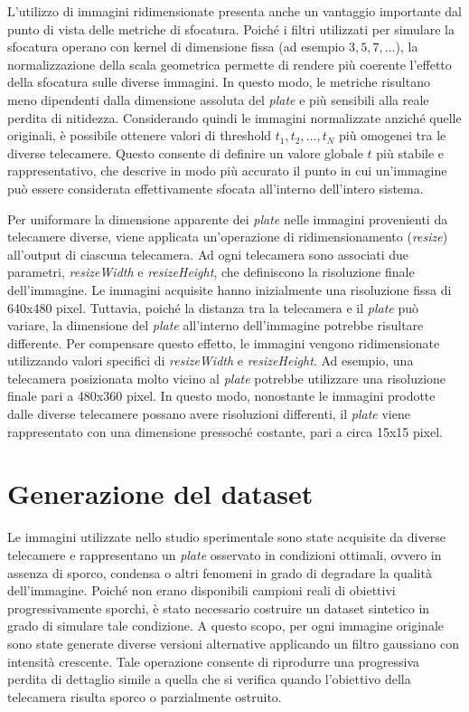 \documentclass[
    target=bach,
    aauheader=,
    style=
]{thud}
\begin{document}
L'utilizzo di immagini ridimensionate presenta anche un vantaggio importante dal punto di vista delle metriche di sfocatura. Poiché i filtri utilizzati per simulare la sfocatura operano con kernel di dimensione fissa (ad esempio $3, 5, 7, \dots$), la normalizzazione della scala geometrica permette di rendere più coerente l'effetto della sfocatura sulle diverse immagini. In questo modo, le metriche risultano meno dipendenti dalla dimensione assoluta del \textit{plate} e più sensibili alla reale perdita di nitidezza. Considerando quindi le immagini normalizzate anziché quelle originali, è possibile ottenere valori di threshold $t_1, t_2, \dots, t_N$ più omogenei tra le diverse telecamere. Questo consente di definire un valore globale $t$ più stabile e rappresentativo, che descrive in modo più accurato il punto in cui un'immagine può essere considerata effettivamente sfocata all'interno dell'intero sistema.

Per uniformare la dimensione apparente dei \textit{plate} nelle immagini provenienti da telecamere diverse, viene applicata un'operazione di ridimensionamento (\textit{resize}) all'output di ciascuna telecamera. Ad ogni telecamera sono associati due parametri, \textit{resizeWidth} e \textit{resizeHeight}, che definiscono la risoluzione finale dell'immagine. Le immagini acquisite hanno inizialmente una risoluzione fissa di 640x480 pixel. Tuttavia, poiché la distanza tra la telecamera e il \textit{plate} può variare, la dimensione del \textit{plate} all'interno dell'immagine potrebbe risultare differente. Per compensare questo effetto, le immagini vengono ridimensionate utilizzando valori specifici di \textit{resizeWidth} e \textit{resizeHeight}. Ad esempio, una telecamera posizionata molto vicino al \textit{plate} potrebbe utilizzare una risoluzione finale pari a 480x360 pixel. In questo modo, nonostante le immagini prodotte dalle diverse telecamere possano avere risoluzioni differenti, il \textit{plate} viene rappresentato con una dimensione pressoché costante, pari a circa 15x15 pixel.

\section{Generazione del dataset}

Le immagini utilizzate nello studio sperimentale sono state acquisite da diverse telecamere e rappresentano un \textit{plate} osservato in condizioni ottimali, ovvero in assenza di sporco, condensa o altri fenomeni in grado di degradare la qualità dell'immagine. Poiché non erano disponibili campioni reali di obiettivi progressivamente sporchi, è stato necessario costruire un dataset sintetico in grado di simulare tale condizione. A questo scopo, per ogni immagine originale sono state generate diverse versioni alternative applicando un filtro gaussiano con intensità crescente. Tale operazione consente di riprodurre una progressiva perdita di dettaglio simile a quella che si verifica quando l'obiettivo della telecamera risulta sporco o parzialmente ostruito.
\end{document}
